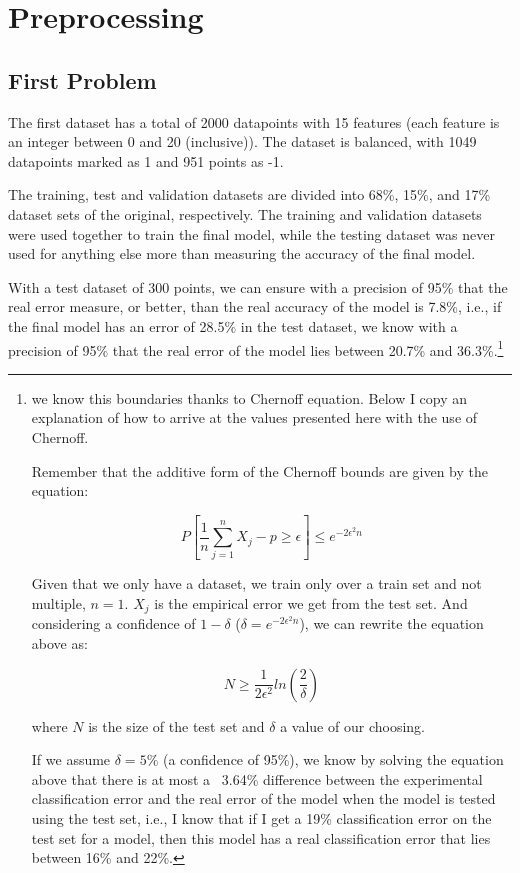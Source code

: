 \documentclass[format=acmtog]{acmart}
\begin{document}
\section{Preprocessing}\label{preprocessing}

\subsection{First Problem}\label{first-problem}

The first dataset has a total of 2000 datapoints with 15 features (each
feature is an integer between 0 and 20 (inclusive)). The dataset is
balanced, with 1049 datapoints marked as 1 and 951 points as -1.

The training, test and validation datasets are divided into 68\%, 15\%,
and 17\% dataset sets of the original, respectively. The training and
validation datasets were used together to train the final model, while
the testing dataset was never used for anything else more than measuring
the accuracy of the final model.

With a test dataset of 300 points, we can ensure with a precision of
95\% that the real error measure, or better, than the real accuracy of
the model is 7.8\%, i.e., if the final model has an error of 28.5\% in
the test dataset, we know with a precision of 95\% that the real error
of the model lies between 20.7\% and 36.3\%.\footnote{
  we know this boundaries thanks to Chernoff equation. Below I copy an
  explanation of how to arrive at the values presented here with the use of Chernoff.

  Remember that the additive form of the Chernoff bounds are given by the equation:

  $$ P\left[\frac{1}{n} \sum_{j=1}^n X_j - p \geq \epsilon \right] \leq e^{-2 \epsilon^2 n} $$

  Given that we only have a dataset, we train only over a train set and not multiple, $n=1$.
  $X_j$ is the empirical error we get from the test set. And considering a confidence
  of $1-\delta$ ($\delta = e^{-2 \epsilon^2 n}$), we can rewrite the equation above as:

  $$ N \geq \frac{1}{2\epsilon^2} ln\left(\frac{2}{\delta}\right) $$

  where $N$ is the size of the test set and $\delta$ a value of our choosing.

  If we assume $\delta = 5\%$ (a confidence of 95\%), we know by solving the equation above
  that there is at most a ~3.64\% difference between the experimental classification error
  and the real error of the model when the model is tested using the test set, i.e., I know
  that if I get a 19\% classification error on the test set for a model, then this model has
  a real classification error that lies between 16\% and 22\%.
}
\end{document}

